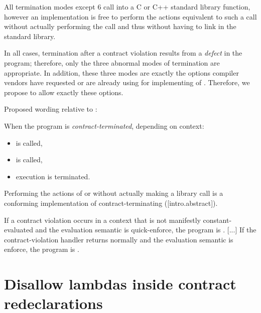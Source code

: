 All termination modes except 6 call into a C or C++ standard library function, however an implementation is free to perform the actions equivalent to such a call without actually performing the call and thus without having to link in the standard library.

In all cases, termination after a contract violation results from a \emph{defect} in the program; therefore, only the three abnormal modes of termination are appropriate. In addition, these three modes are exactly the options compiler vendors have requested or are already using for implementing of \cite{P2900R11}. Therefore, we propose to allow exactly these options.

Proposed wording relative to \cite{P2900R11}:

\begin{adjustwidth}{0.5cm}{0.5cm}
\begin{addedblock}
When the program is \emph{contract-terminated}, depending on context:
\begin{itemize}
\item {} is called,
\item {} is called,
\item execution is terminated.
\end{itemize}
\begin{note}
Performing the actions of  or  without actually making a library call is a conforming implementation of contract-terminating ([intro.abstract]).
\end{note}
\end{addedblock}

If a contract violation occurs in a context that is not manifestly constant-evaluated and the evaluation semantic is quick-enforce, the program is . [...] If the contract-violation handler returns normally and the evaluation semantic is enforce, the program is .
\end{adjustwidth}

\pagebreak

\section{Disallow lambdas inside contract redeclarations}

